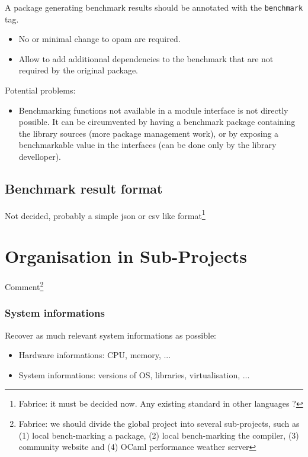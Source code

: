 \documentclass[11pt,a4paper]{article}
\begin{document}
A package generating benchmark results should be annotated with the
\texttt{benchmark} tag.

\begin{itemize}
\item No or minimal change to opam are required.
\item Allow to add additionnal dependencies to the benchmark that are
  not required by the original package.
\end{itemize}

Potential problems:
\begin{itemize}
\item Benchmarking functions not available in a module interface is
  not directly possible. It can be circumvented by having a benchmark
  package containing the library sources (more package management
  work), or by exposing a benchmarkable value in the interfaces (can
  be done only by the library develloper).
\end{itemize}

\subsection{Benchmark result format}

Not decided, probably a simple json or csv like
format\footnote{Fabrice: it must be decided now. Any existing standard
  in other languages ?}

\section{Organisation in Sub-Projects}

Comment\footnote{Fabrice: we should divide the global project into
  several sub-projects, such as (1) local bench-marking a package, (2)
  local bench-marking the compiler, (3) community website and (4)
  OCaml performance weather server}

\subsubsection{System informations}

Recover as much relevant system informations as possible:
\begin{itemize}
\item Hardware informations: CPU, memory, ...
\item System informations: versions of OS, libraries, virtualisation, ...
\end{itemize}
\end{document}
